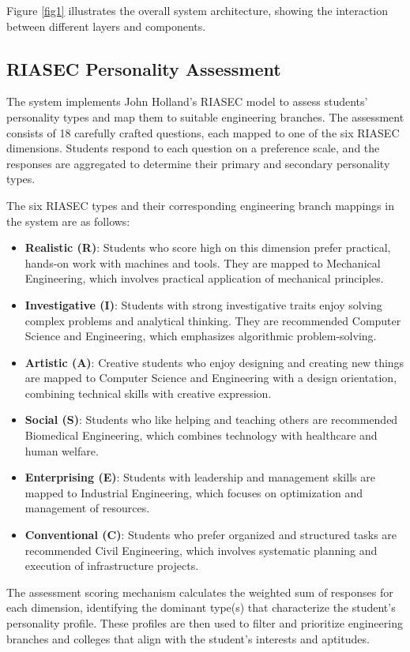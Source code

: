 \documentclass[journal]{IEEEtran}
\begin{document}
Figure \ref{fig1} illustrates the overall system architecture, showing the interaction between different layers and components.

\subsection{RIASEC Personality Assessment}
The system implements John Holland's RIASEC model to assess students' personality types and map them to suitable engineering branches. The assessment consists of 18 carefully crafted questions, each mapped to one of the six RIASEC dimensions. Students respond to each question on a preference scale, and the responses are aggregated to determine their primary and secondary personality types.

The six RIASEC types and their corresponding engineering branch mappings in the system are as follows:

\begin{itemize}
\item \textbf{Realistic (R)}: Students who score high on this dimension prefer practical, hands-on work with machines and tools. They are mapped to Mechanical Engineering, which involves practical application of mechanical principles.
\item \textbf{Investigative (I)}: Students with strong investigative traits enjoy solving complex problems and analytical thinking. They are recommended Computer Science and Engineering, which emphasizes algorithmic problem-solving.
\item \textbf{Artistic (A)}: Creative students who enjoy designing and creating new things are mapped to Computer Science and Engineering with a design orientation, combining technical skills with creative expression.
\item \textbf{Social (S)}: Students who like helping and teaching others are recommended Biomedical Engineering, which combines technology with healthcare and human welfare.
\item \textbf{Enterprising (E)}: Students with leadership and management skills are mapped to Industrial Engineering, which focuses on optimization and management of resources.
\item \textbf{Conventional (C)}: Students who prefer organized and structured tasks are recommended Civil Engineering, which involves systematic planning and execution of infrastructure projects.
\end{itemize}

The assessment scoring mechanism calculates the weighted sum of responses for each dimension, identifying the dominant type(s) that characterize the student's personality profile. These profiles are then used to filter and prioritize engineering branches and colleges that align with the student's interests and aptitudes.
\end{document}
